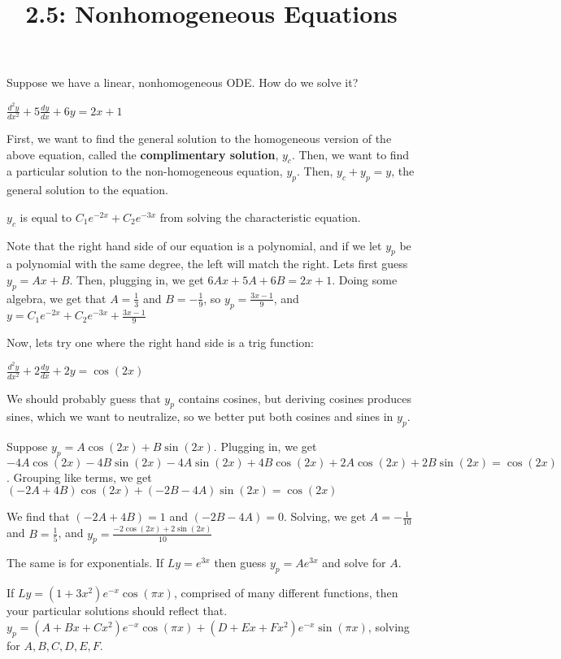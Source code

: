 \documentclass{article}
\title{2.5: Nonhomogeneous Equations}
\begin{document}
\maketitle
Suppose we have a linear, nonhomogeneous ODE. How do we solve it?

\begin{example}
$\frac{d^2y}{dx^2} + 5 \frac{dy}{dx} + 6y = 2x+1$

First, we want to find the general solution to the homogeneous version of the above equation, called the \textbf{complimentary solution}, $y_c$. Then, we want to find a particular solution to the non-homogeneous equation, $y_p$. Then, $y_c + y_p = y$, the general solution to the equation. 

$y_c$ is equal to $C_1e^{-2x} + C_2e^{-3x}$ from solving the characteristic equation.

Note that the right hand side of our equation is a polynomial, and if we let $y_p$ be a polynomial with the same degree, the left will match the right. Lets first guess $y_p = Ax + B$. Then, plugging in, we get $6Ax + 5A + 6B = 2x+1$. Doing some algebra, we get that $A = \frac{1}{3}$ and $B = -\frac{1}{9}$, so $y_p = \frac{3x-1}{9}$, and $y = C_1e^{-2x} + C_2 e^{-3x} + \frac{3x-1}{9}$
\end{example}

Now, lets try one where the right hand side is a trig function:

\begin{example}
$\frac{d^2y}{dx^2} + 2 \frac{dy}{dx} + 2y = \cos(2x)$

We should probably guess that $y_p$ contains cosines, but deriving cosines produces sines, which we want to neutralize, so we better put both cosines and sines in $y_p$.

Suppose $y_p = A\cos(2x) + B\sin(2x)$. Plugging in, we get $-4A\cos(2x) - 4B\sin(2x) - 4A\sin(2x) + 4B\cos(2x) + 2A\cos(2x) + 2B\sin(2x) = \cos(2x)$. Grouping like terms, we get $(-2A + 4B)\cos(2x) + (-2B -4A)\sin(2x) = \cos(2x)$

We find that $(-2A + 4B) = 1$ and $(-2B - 4A) = 0$. Solving, we get $A = -\frac{1}{10}$ and $B = \frac{1}{5}$, and $y_p = \frac{-2\cos(2x) + 2\sin(2x)}{10}$
\end{example}

The same is for exponentials. If $Ly = e^{3x}$ then guess $y_p = Ae^{3x}$ and solve for $A$. 

If $Ly = (1+3x^2)e^{-x}\cos(\pi x)$, comprised of many different functions, then your particular solutions should reflect that. $y_p = (A+Bx+Cx^2)e^{-x}\cos(\pi x) + (D+Ex+Fx^2)e^{-x}\sin(\pi x)$, solving for $A,B,C,D,E,F$. 
\end{document}
